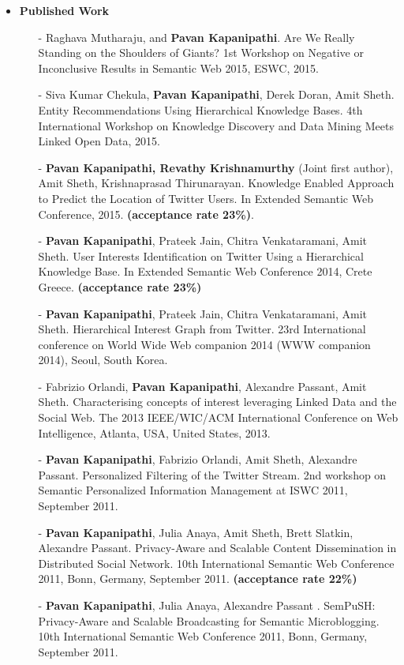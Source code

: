 \documentclass[letterpaper,9pt]{article}
\begin{document}
\begin{itemize}

\item\textbf{Published Work}
\begin{itemize}

\item[-] Raghava Mutharaju, and \textbf{Pavan Kapanipathi}. Are We Really Standing on the Shoulders of Giants? 1st Workshop on Negative or Inconclusive Results in Semantic Web 2015, ESWC, 2015.
\item[-] Siva Kumar Chekula, \textbf{Pavan Kapanipathi}, Derek Doran, Amit Sheth. Entity Recommendations Using Hierarchical Knowledge Bases. 4th  International Workshop on Knowledge Discovery and Data Mining Meets Linked Open Data, 2015.
\item[-] \textbf{Pavan Kapanipathi, Revathy Krishnamurthy} (Joint first author), Amit Sheth, Krishnaprasad Thirunarayan. Knowledge Enabled Approach to Predict the Location of Twitter Users. In Extended Semantic Web Conference, 2015. \textbf{(acceptance rate 23\%)}.
\item[-] \textbf{Pavan Kapanipathi}, Prateek Jain, Chitra Venkataramani, Amit Sheth. User Interests Identification on Twitter Using a Hierarchical Knowledge Base. In  Extended Semantic Web Conference 2014, Crete Greece. \textbf{(acceptance rate 23\%)}
\item[-] \textbf{Pavan Kapanipathi}, Prateek Jain, Chitra Venkataramani, Amit Sheth. Hierarchical Interest Graph from Twitter.  23rd International conference on World Wide Web companion 2014 (WWW companion 2014), Seoul, South Korea. 
\item[-] Fabrizio Orlandi, \textbf{Pavan Kapanipathi}, Alexandre Passant, Amit Sheth. Characterising concepts of interest leveraging Linked Data and the Social Web. The 2013 IEEE/WIC/ACM International Conference on Web Intelligence, Atlanta, USA, United States, 2013.
\item[-] \textbf{Pavan Kapanipathi}, Fabrizio Orlandi, Amit Sheth, Alexandre Passant. Personalized Filtering of the Twitter Stream. 2nd workshop on Semantic Personalized Information Management at ISWC 2011, September 2011. 
\item[-] \textbf{Pavan Kapanipathi}, Julia Anaya, Amit Sheth, Brett Slatkin, Alexandre Passant. Privacy-Aware and Scalable Content Dissemination in Distributed Social Network. 10th International Semantic Web Conference 2011, Bonn, Germany,  September 2011. \textbf{(acceptance rate 22\%)}
\item[-] \textbf{Pavan Kapanipathi}, Julia Anaya, Alexandre Passant . SemPuSH: Privacy-Aware and Scalable Broadcasting for Semantic Microblogging. 10th International Semantic Web Conference 2011, Bonn, Germany, September 2011.

\end{itemize}
\end{itemize}
\end{document}
